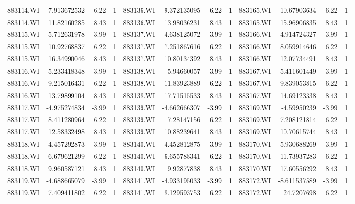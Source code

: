 \documentclass{sysuthesis}
\begin{document}
\begin{table}[htbp]
{\begin{tabular}{rrrrrrrrrrrr}
    883114.WI & 7.913672532 & 6.22  & 1     & 883136.WI & 9.372135095 & 6.22  & 1     & 883165.WI & 10.67903634 & 6.22  & 1 \\
    883114.WI & 11.82160285 & 8.43  & 1     & 883136.WI & 13.98036231 & 8.43  & 1     & 883165.WI & 15.96906835 & 8.43  & 1 \\
    883115.WI & -5.712631978 & -3.99 & 1     & 883137.WI & -4.638125072 & -3.99 & 1     & 883166.WI & -4.914724327 & -3.99 & 1 \\
    883115.WI & 10.92768837 & 6.22  & 1     & 883137.WI & 7.251867616 & 6.22  & 1     & 883166.WI & 8.059914646 & 6.22  & 1 \\
    883115.WI & 16.34990046 & 8.43  & 1     & 883137.WI & 10.80134392 & 8.43  & 1     & 883166.WI & 12.07734491 & 8.43  & 1 \\
    883116.WI & -5.233418348 & -3.99 & 1     & 883138.WI & -5.94660057 & -3.99 & 1     & 883167.WI & -5.411601449 & -3.99 & 1 \\
    883116.WI & 9.215016431 & 6.22  & 1     & 883138.WI & 11.83923889 & 6.22  & 1     & 883167.WI & 9.839053815 & 6.22  & 1 \\
    883116.WI & 13.79899104 & 8.43  & 1     & 883138.WI & 17.71515533 & 8.43  & 1     & 883167.WI & 14.69123338 & 8.43  & 1 \\
    883117.WI & -4.975274834 & -3.99 & 1     & 883139.WI & -4.662666307 & -3.99 & 1     & 883169.WI & -4.59950239 & -3.99 & 1 \\
    883117.WI & 8.411280964 & 6.22  & 1     & 883139.WI & 7.28147156 & 6.22  & 1     & 883169.WI & 7.208121814 & 6.22  & 1 \\
    883117.WI & 12.58332498 & 8.43  & 1     & 883139.WI & 10.88239641 & 8.43  & 1     & 883169.WI & 10.70615744 & 8.43  & 1 \\
    883118.WI & -4.457292873 & -3.99 & 1     & 883140.WI & -4.452812875 & -3.99 & 1     & 883170.WI & -5.930688269 & -3.99 & 1 \\
    883118.WI & 6.679621299 & 6.22  & 1     & 883140.WI & 6.655788341 & 6.22  & 1     & 883170.WI & 11.73937283 & 6.22  & 1 \\
    883118.WI & 9.960587121 & 8.43  & 1     & 883140.WI & 9.92877838 & 8.43  & 1     & 883170.WI & 17.60556292 & 8.43  & 1 \\
    883119.WI & -4.688665079 & -3.99 & 1     & 883141.WI & -4.933195033 & -3.99 & 1     & 883172.WI & -8.611537589 & -3.99 & 1 \\
    883119.WI & 7.409411802 & 6.22  & 1     & 883141.WI & 8.129593753 & 6.22  & 1     & 883172.WI & 24.7207698 & 6.22  & 1 \\

\end{tabular}}
\end{table}
\end{document}
